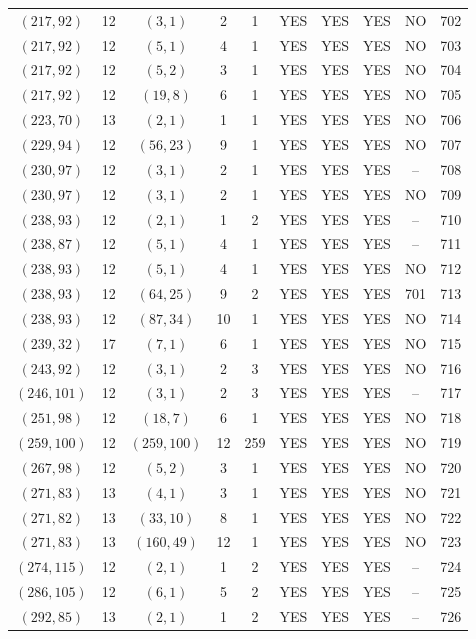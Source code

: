 \begin{longtable}{|c|c|c|c|c|c|c|c|c|c|}
$(217, 92)$ & 12 & $(3, 1)$ & 2 & 1 & YES & YES & YES & NO & 702\\
$(217, 92)$ & 12 & $(5, 1)$ & 4 & 1 & YES & YES & YES & NO & 703\\
$(217, 92)$ & 12 & $(5, 2)$ & 3 & 1 & YES & YES & YES & NO & 704\\
$(217, 92)$ & 12 & $(19, 8)$ & 6 & 1 & YES & YES & YES & NO & 705\\
$(223, 70)$ & 13 & $(2, 1)$ & 1 & 1 & YES & YES & YES & NO & 706\\
$(229, 94)$ & 12 & $(56, 23)$ & 9 & 1 & YES & YES & YES & NO & 707\\
$(230, 97)$ & 12 & $(3, 1)$ & 2 & 1 & YES & YES & YES & -- & 708\\
$(230, 97)$ & 12 & $(3, 1)$ & 2 & 1 & YES & YES & YES & NO & 709\\
$(238, 93)$ & 12 & $(2, 1)$ & 1 & 2 & YES & YES & YES & -- & 710\\
$(238, 87)$ & 12 & $(5, 1)$ & 4 & 1 & YES & YES & YES & -- & 711\\
$(238, 93)$ & 12 & $(5, 1)$ & 4 & 1 & YES & YES & YES & NO & 712\\
$(238, 93)$ & 12 & $(64, 25)$ & 9 & 2 & YES & YES & YES & 701 & 713\\
$(238, 93)$ & 12 & $(87, 34)$ & 10 & 1 & YES & YES & YES & NO & 714\\
$(239, 32)$ & 17 & $(7, 1)$ & 6 & 1 & YES & YES & YES & NO & 715\\
$(243, 92)$ & 12 & $(3, 1)$ & 2 & 3 & YES & YES & YES & NO & 716\\
$(246, 101)$ & 12 & $(3, 1)$ & 2 & 3 & YES & YES & YES & -- & 717\\
$(251, 98)$ & 12 & $(18, 7)$ & 6 & 1 & YES & YES & YES & NO & 718\\
$(259, 100)$ & 12 & $(259, 100)$ & 12 & 259 & YES & YES & YES & NO & 719\\
$(267, 98)$ & 12 & $(5, 2)$ & 3 & 1 & YES & YES & YES & NO & 720\\
$(271, 83)$ & 13 & $(4, 1)$ & 3 & 1 & YES & YES & YES & NO & 721\\
$(271, 82)$ & 13 & $(33, 10)$ & 8 & 1 & YES & YES & YES & NO & 722\\
$(271, 83)$ & 13 & $(160, 49)$ & 12 & 1 & YES & YES & YES & NO & 723\\
$(274, 115)$ & 12 & $(2, 1)$ & 1 & 2 & YES & YES & YES & -- & 724\\
$(286, 105)$ & 12 & $(6, 1)$ & 5 & 2 & YES & YES & YES & -- & 725\\
$(292, 85)$ & 13 & $(2, 1)$ & 1 & 2 & YES & YES & YES & -- & 726\\

\end{longtable}
